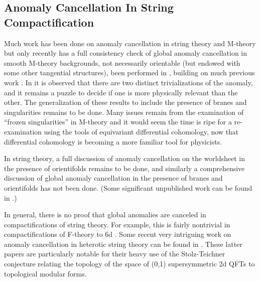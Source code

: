 \documentclass[12pt]{article}
\begin{document}
\subsection{Anomaly Cancellation In String Compactification}


Much work has been done on anomaly cancellation in string theory
and M-theory but only recently has a full consistency check of global anomaly
cancellation in smooth M-theory backgrounds, not necessarily
orientable (but endowed with some other tangential structures),
been performed in \cite{Freed:2019sco}, building on much previous work
\cite{Witten:1996md,Diaconescu:2000wy,Diaconescu:2003bm,Freed:2004yc,Witten:2016cio}.
In \cite{Freed:2019sco} it is observed that there 
are two distinct trivializations of the anomaly, and it remains a
puzzle to decide if one is more physically relevant than the other.
The generalization of these results to include the presence of branes and singularities remains
to be done. Many issues remain from the  examination of ``frozen singularities''
in M-theory \cite{deBoer:2001wca} and it would seem the time is ripe for
a re-examination using the tools of equivariant differential cohomology,
now that differential cohomology is becoming a more familiar tool
for physicists.


In string theory, a full discussion of anomaly cancellation on the
worldsheet in the presence of orientifolds remains to be done,
and similarly a comprehensive discussion of
global anomaly cancellation in the presence of
branes and orientifolds has not been done.
(Some significant unpublished work can be found in
\cite{FreedOrientifolds}.)



In general, there is no proof that global anomalies
are canceled in compactifications of string theory.
For example, this is fairly nontrivial in compactifications
of F-theory to 6d 
\cite{Kumar:2010ru, Taylor:2011wt, Grassi:2011hq,  Monnier:2017oqd,Monnier:2018cfa,Monnier:2018nfs}. 
Some recent very intriguing work on anomaly cancellation in heterotic string theory can be found in  \cite{Tachikawa:2021mvw,Tachikawa:2021mby,Yonekura:2022reu}. These latter papers are particularly notable for their heavy use of the   Stolz-Teichner conjecture
relating the topology of the space of (0,1) supersymmetric 2d QFTs to topological modular forms.
\end{document}

